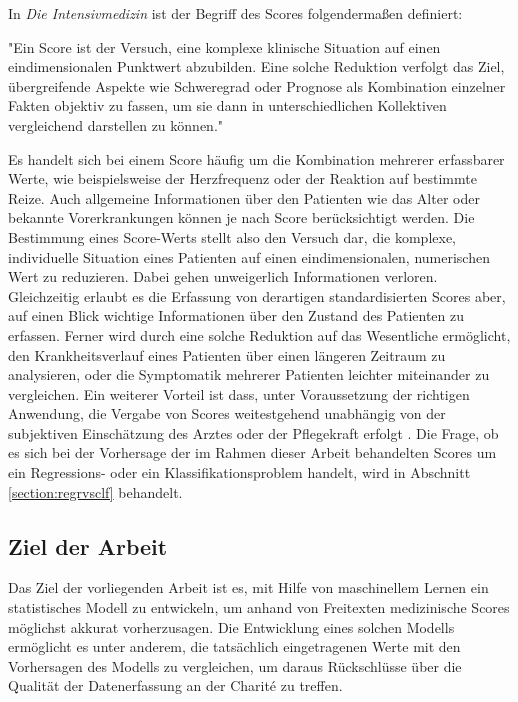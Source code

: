 In \textit{Die Intensivmedizin} \citep{marxIntensivmedizin2015c} ist der Begriff des Scores folgendermaßen definiert:

\begin{itquote}
    "Ein Score ist der Versuch, eine komplexe klinische Situation auf einen eindimensionalen Punktwert abzubilden. Eine solche Reduktion verfolgt das Ziel, übergreifende Aspekte wie Schweregrad oder Prognose als Kombination einzelner Fakten objektiv zu fassen, um sie dann in unterschiedlichen Kollektiven vergleichend darstellen zu können."
\end{itquote}

Es handelt sich bei einem Score häufig um die Kombination mehrerer erfassbarer Werte, wie beispielsweise der Herzfrequenz oder der Reaktion auf bestimmte Reize. Auch allgemeine Informationen über den Patienten wie das Alter oder bekannte Vorerkrankungen können je nach Score berücksichtigt werden. Die Bestimmung eines Score-Werts stellt also den Versuch dar, die komplexe, individuelle Situation eines Patienten auf einen eindimensionalen, numerischen Wert zu reduzieren. Dabei gehen unweigerlich Informationen verloren. Gleichzeitig erlaubt es die Erfassung von derartigen standardisierten Scores aber, auf einen Blick wichtige Informationen über den Zustand des Patienten zu erfassen. Ferner wird durch eine solche Reduktion auf das Wesentliche ermöglicht, den Krankheitsverlauf eines Patienten über einen längeren Zeitraum zu analysieren, oder die Symptomatik mehrerer Patienten leichter miteinander zu vergleichen. Ein weiterer Vorteil ist dass, unter Voraussetzung der richtigen Anwendung, die Vergabe von Scores weitestgehend unabhängig von der subjektiven Einschätzung des Arztes oder der Pflegekraft erfolgt \citep{marxIntensivmedizin2015c}.
Die Frage, ob es sich bei der Vorhersage der im Rahmen dieser Arbeit behandelten Scores um ein Regressions- oder ein Klassifikationsproblem handelt, wird in Abschnitt \ref{section:regrvsclf} behandelt. 

\subsection{Ziel der Arbeit}
Das Ziel der vorliegenden Arbeit ist es, mit Hilfe von maschinellem Lernen ein statistisches Modell zu entwickeln, um anhand von Freitexten medizinische Scores möglichst akkurat vorherzusagen. Die Entwicklung eines solchen Modells ermöglicht es unter anderem, die tatsächlich eingetragenen Werte mit den Vorhersagen des Modells zu vergleichen, um daraus Rückschlüsse über die Qualität der Datenerfassung an der Charité zu treffen.

